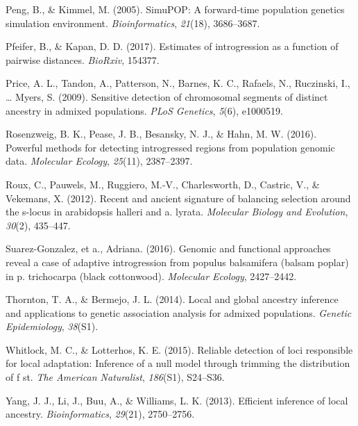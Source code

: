 \documentclass[12pt,twoside]{reedthesis}
\begin{document}
  \hypertarget{ref-peng2005simupop}{}
  Peng, B., \& Kimmel, M. (2005). SimuPOP: A forward-time population
  genetics simulation environment. \emph{Bioinformatics}, \emph{21}(18),
  3686--3687.
  
  \hypertarget{ref-pfeifer2017estimates}{}
  Pfeifer, B., \& Kapan, D. D. (2017). Estimates of introgression as a
  function of pairwise distances. \emph{BioRxiv}, 154377.
  
  \hypertarget{ref-price2009sensitive}{}
  Price, A. L., Tandon, A., Patterson, N., Barnes, K. C., Rafaels, N.,
  Ruczinski, I., \ldots{} Myers, S. (2009). Sensitive detection of
  chromosomal segments of distinct ancestry in admixed populations.
  \emph{PLoS Genetics}, \emph{5}(6), e1000519.
  
  \hypertarget{ref-rosenzweig2016powerful}{}
  Rosenzweig, B. K., Pease, J. B., Besansky, N. J., \& Hahn, M. W. (2016).
  Powerful methods for detecting introgressed regions from population
  genomic data. \emph{Molecular Ecology}, \emph{25}(11), 2387--2397.
  
  \hypertarget{ref-roux2012recent}{}
  Roux, C., Pauwels, M., Ruggiero, M.-V., Charlesworth, D., Castric, V.,
  \& Vekemans, X. (2012). Recent and ancient signature of balancing
  selection around the s-locus in arabidopsis halleri and a. lyrata.
  \emph{Molecular Biology and Evolution}, \emph{30}(2), 435--447.
  
  \hypertarget{ref-suarez2016}{}
  Suarez-Gonzalez, et a., Adriana. (2016). Genomic and functional
  approaches reveal a case of adaptive introgression from populus
  balsamifera (balsam poplar) in p. trichocarpa (black cottonwood).
  \emph{Molecular Ecology}, 2427--2442.
  
  \hypertarget{ref-thornton2014local}{}
  Thornton, T. A., \& Bermejo, J. L. (2014). Local and global ancestry
  inference and applications to genetic association analysis for admixed
  populations. \emph{Genetic Epidemiology}, \emph{38}(S1).
  
  \hypertarget{ref-whitlock2015reliable}{}
  Whitlock, M. C., \& Lotterhos, K. E. (2015). Reliable detection of loci
  responsible for local adaptation: Inference of a null model through
  trimming the distribution of f st. \emph{The American Naturalist},
  \emph{186}(S1), S24--S36.
  
  \hypertarget{ref-yang2013efficient}{}
  Yang, J. J., Li, J., Buu, A., \& Williams, L. K. (2013). Efficient
  inference of local ancestry. \emph{Bioinformatics}, \emph{29}(21),
  2750--2756.
  
\end{document}
